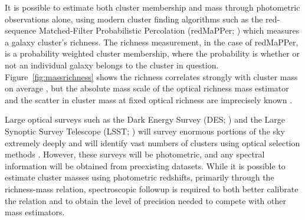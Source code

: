 It is possible to estimate both cluster membership and mass through photometric observations alone, using modern cluster finding algorithms such as the red-sequence Matched-Filter Probabilistic Percolation (redMaPPer; \citealt{Rykoff2014}) which measures a galaxy cluster's richness. The richness measurement, in the case of redMaPPer, is a probability weighted cluster membership, where the probability is whether or not an individual galaxy belongs to the cluster in question. Figure~\ref{fig:massrichness} shows the richness correlates strongly with cluster mass on average , but the absolute mass scale of the optical richness mass estimator and the scatter in cluster mass at fixed optical richness are imprecisely known \citep{Rykoff2012}.

Large optical surveys such as the Dark Energy Survey (DES; \citealt{DES2005}) and the Large Synoptic Survey Telescope (LSST; \citealt{LSST2012}) will survey enormous portions of the sky extremely deeply and will identify vast numbers of clusters using optical selection methods . However, these surveys will be photometric, and any spectral information will be obtained from preexisting datasets. While it is possible to estimate cluster masses using photometric redshifts, primarily through the richness-mass relation, spectroscopic followup is required to both better calibrate the relation and to obtain the level of precision needed to compete with other mass estimators. 

